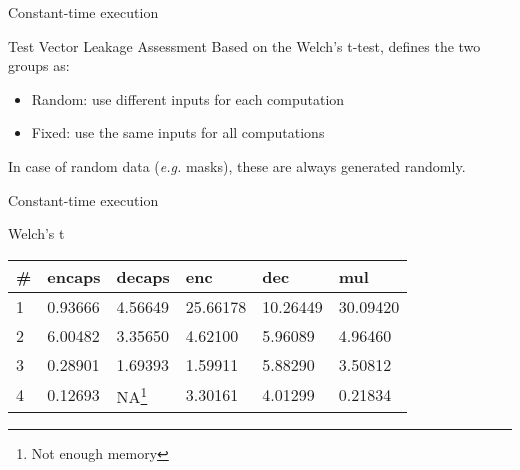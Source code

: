 \begin{frame}{Constant-time execution}
    \begin{block}{Test Vector Leakage Assessment}
        Based on the Welch's t-test, defines the two groups as:
        \begin{itemize}
            \item Random: use different inputs for each computation
            \item Fixed: use the same inputs for all computations
        \end{itemize}
        In case of random data (\textit{e.g.} masks), these are always generated randomly.
    \end{block}
\end{frame}

\begin{frame}{Constant-time execution}
    \begin{block}{Welch's t}
        \begin{table}
            \begin{tabular}{llllll}
                \# & encaps & decaps & enc & dec & mul \\ \hline
                1 & 0.93666 & 4.56649 & 25.66178 & 10.26449 & 30.09420 \\
                2 & 6.00482 & 3.35650 & 4.62100 & 5.96089 & 4.96460 \\
                3 & 0.28901 & 1.69393 & 1.59911 & 5.88290 & 3.50812 \\
                4 & 0.12693 & NA\footnote{Not enough memory} & 3.30161 & 4.01299 & 0.21834
            \end{tabular}
        \end{table}        
    \end{block}
\end{frame}
